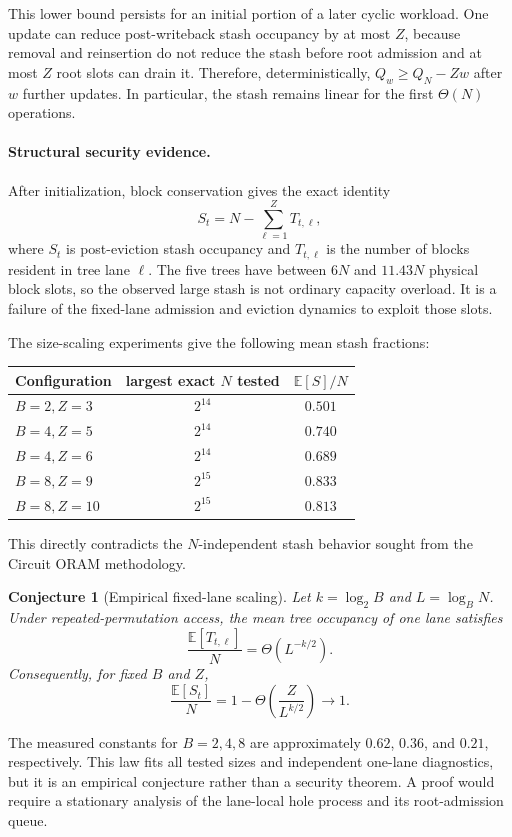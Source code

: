 \documentclass[11pt]{article}
\newtheorem{conjecture}{Conjecture}
\begin{document}
This lower bound persists for an initial portion of a later cyclic workload.
One update can reduce post-writeback stash occupancy by at most $Z$, because
removal and reinsertion do not reduce the stash before root admission and at
most $Z$ root slots can drain it.  Therefore, deterministically,
$Q_w\geq Q_N-Zw$ after $w$ further updates.  In particular, the stash remains
linear for the first $\Theta(N)$ operations.

\paragraph{Structural security evidence.}
After initialization, block conservation gives the exact identity
\[
  S_t=N-\sum_{\ell=1}^{Z}T_{t,\ell},
\]
where $S_t$ is post-eviction stash occupancy and $T_{t,\ell}$ is the number of
blocks resident in tree lane $\ell$.  The five trees have between $6N$ and
$11.43N$ physical block slots, so the observed large stash is not ordinary
capacity overload.  It is a failure of the fixed-lane admission and eviction
dynamics to exploit those slots.

The size-scaling experiments give the following mean stash fractions:
\begin{center}
\begin{tabular}{lcc}
\toprule
Configuration & largest exact $N$ tested & $\mathbb{E}[S]/N$ \\
\midrule
$B=2,Z=3$   & $2^{14}$ & $0.501$ \\
$B=4,Z=5$   & $2^{14}$ & $0.740$ \\
$B=4,Z=6$   & $2^{14}$ & $0.689$ \\
$B=8,Z=9$   & $2^{15}$ & $0.833$ \\
$B=8,Z=10$  & $2^{15}$ & $0.813$ \\
\bottomrule
\end{tabular}
\end{center}
This directly contradicts the $N$-independent stash behavior sought from the
Circuit ORAM methodology.

\begin{conjecture}[Empirical fixed-lane scaling]
Let $k=\log_2B$ and $L=\log_BN$.  Under repeated-permutation access, the mean
tree occupancy of one lane satisfies
\[
  \frac{\mathbb{E}[T_{t,\ell}]}{N}
  =\Theta\!\left(L^{-k/2}\right).
\]
Consequently, for fixed $B$ and $Z$,
\[
  \frac{\mathbb{E}[S_t]}{N}
  =1-\Theta\!\left(\frac{Z}{L^{k/2}}\right)\longrightarrow1.
\]
\end{conjecture}
The measured constants for $B=2,4,8$ are approximately $0.62$, $0.36$, and
$0.21$, respectively.  This law fits all tested sizes and independent one-lane
diagnostics, but it is an empirical conjecture rather than a security theorem.
A proof would require a stationary analysis of the lane-local hole process and
its root-admission queue.
\end{document}
